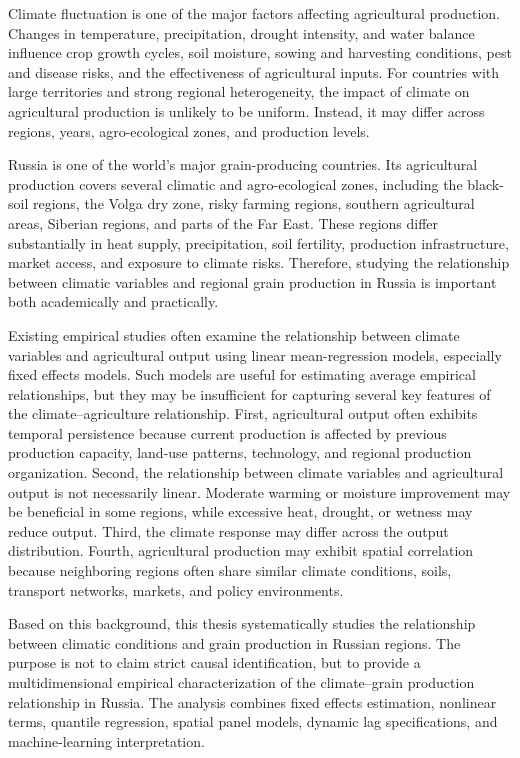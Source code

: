 \documentclass[12pt,a4paper]{article}
\begin{document}
Climate fluctuation is one of the major factors affecting agricultural production. Changes in temperature, precipitation, drought intensity, and water balance influence crop growth cycles, soil moisture, sowing and harvesting conditions, pest and disease risks, and the effectiveness of agricultural inputs. For countries with large territories and strong regional heterogeneity, the impact of climate on agricultural production is unlikely to be uniform. Instead, it may differ across regions, years, agro-ecological zones, and production levels.

Russia is one of the world's major grain-producing countries. Its agricultural production covers several climatic and agro-ecological zones, including the black-soil regions, the Volga dry zone, risky farming regions, southern agricultural areas, Siberian regions, and parts of the Far East. These regions differ substantially in heat supply, precipitation, soil fertility, production infrastructure, market access, and exposure to climate risks. Therefore, studying the relationship between climatic variables and regional grain production in Russia is important both academically and practically.

Existing empirical studies often examine the relationship between climate variables and agricultural output using linear mean-regression models, especially fixed effects models. Such models are useful for estimating average empirical relationships, but they may be insufficient for capturing several key features of the climate--agriculture relationship. First, agricultural output often exhibits temporal persistence because current production is affected by previous production capacity, land-use patterns, technology, and regional production organization. Second, the relationship between climate variables and agricultural output is not necessarily linear. Moderate warming or moisture improvement may be beneficial in some regions, while excessive heat, drought, or wetness may reduce output. Third, the climate response may differ across the output distribution. Fourth, agricultural production may exhibit spatial correlation because neighboring regions often share similar climate conditions, soils, transport networks, markets, and policy environments.

Based on this background, this thesis systematically studies the relationship between climatic conditions and grain production in Russian regions. The purpose is not to claim strict causal identification, but to provide a multidimensional empirical characterization of the climate--grain production relationship in Russia. The analysis combines fixed effects estimation, nonlinear terms, quantile regression, spatial panel models, dynamic lag specifications, and machine-learning interpretation.
\end{document}
